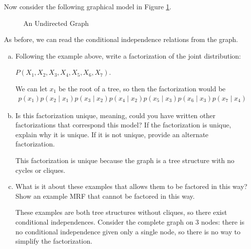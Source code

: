 \documentclass{article}
\newcommand{\ztnodesize}{.6}
\begin{document}
Now consider the following graphical model in Figure \ref{fig:utm}.
\begin{figure}[h!]
	\begin{center}
		\caption{An Undirected Graph}
			\label{fig:utm}
		\end{center}
\end{figure}

As before, we can read the conditional independence relations from the graph. 
\newpage
\begin{enumerate}[(a)]
\item Following the example above, write a factorization of the joint distribution:

\begin{center}
$P(X_1,X_2,X_3,X_4,X_5,X_6,X_7)$.
\end{center}
\begin{soln}
	We can let $x_1$ be the root of a tree, so then the factorization would be
	\begin{align*}
		p(x_1) p(x_2\mid x_1) p(x_3\mid x_2) p(x_4\mid x_2) p(x_5\mid x_3) p(x_6\mid x_3) p(x_7\mid x_4)
	\end{align*}
\end{soln}

\item Is this factorization unique, meaning, could you have written other factorizations that correspond this model? If the factorization is unique, explain why it is unique. If it is not unique, provide an alternate factorization.
	\begin{soln}
		This factorization is unique because the graph is a tree structure with no cycles or cliques.
	\end{soln}

\item What is it about these examples that allows them to be factored in this way? Show an example MRF that cannot be factored in this way.
	\begin{soln}
		These examples are both tree structures without cliques, so there exist conditional independences. Consider the complete graph on 3 nodes: there is no conditional independence given only a single node, so there is no way to simplify the factorization.
	\end{soln}
\end{enumerate}
	
\end{document}

